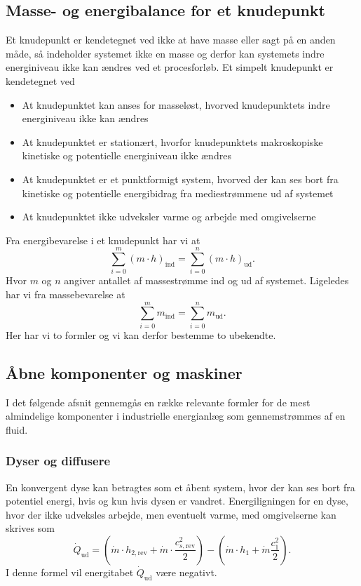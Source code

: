 \subsection{Masse- og energibalance for et knudepunkt} \label{afs:knude}
Et knudepunkt er kendetegnet ved ikke at have masse eller sagt på en anden måde, så indeholder systemet ikke en masse og derfor kan systemets indre energiniveau ikke kan ændres ved et procesforløb. Et simpelt knudepunkt er kendetegnet ved
\begin{itemize}
  \item At knudepunktet kan anses for masseløst, hvorved knudepunktets indre energiniveau ikke kan ændres
  \item At knudepunktet er stationært, hvorfor knudepunktets makroskopiske kinetiske og potentielle energiniveau ikke ændres
  \item At knudepunktet er et punktformigt system, hvorved der kan ses bort fra kinetiske og potentielle energibidrag fra mediestrømmene ud af systemet
  \item At knudepunktet ikke udveksler varme og arbejde med omgivelserne
\end{itemize}
Fra energibevarelse i et knudepunkt har vi at
\[ 
\sum_{i = 0}^{m} \left( m \cdot h \right)_{\text{ind}} = \sum_{i = 0}^{n} \left( m \cdot h \right)_{\text{ud}} 
.\]
Hvor $m$ og $n$ angiver antallet af massestrømme ind og ud af systemet. Ligeledes har vi fra massebevarelse at
\[ 
\sum_{i = 0}^{m} m_{\text{ind}} = \sum_{i = 0}^{n} m_{\text{ud}}
.\]
Her har vi to formler og vi kan derfor bestemme to ubekendte. 

\subsection{Åbne komponenter og maskiner}
I det følgende afsnit gennemgås en række relevante formler for de mest almindelige komponenter i industrielle energianlæg som gennemstrømmes af en fluid. 

\subsubsection{Dyser og diffusere}
En konvergent dyse kan betragtes som et åbent system, hvor der kan ses bort fra potentiel energi, hvis og kun hvis dysen er vandret. Energiligningen for en dyse, hvor der ikke udveksles arbejde, men eventuelt varme, med omgivelserne kan skrives som
\[ 
\dot{Q}_{\text{ud}} = \left( \dot{m} \cdot h_{2, \text{rev}} + \dot{m} \cdot \frac{c^2_{s, \text{rev}}}{2} \right) - \left( \dot{m} \cdot h_1 + \dot{m} \frac{c_1^2}{2} \right)
.\]
I denne formel vil energitabet $\dot{Q}_{\text{ud}}$ være negativt. 

